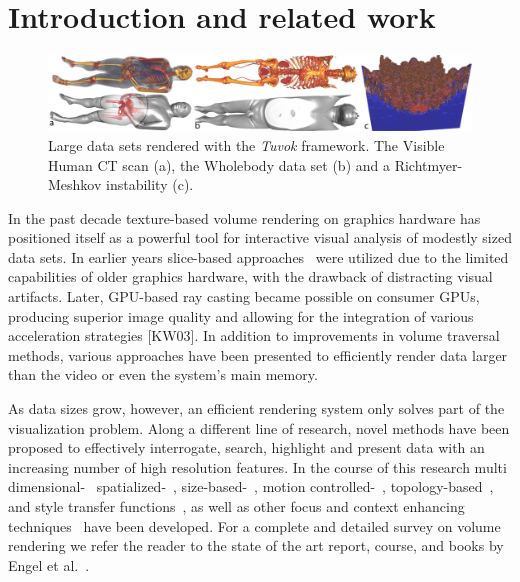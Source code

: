 \section{Introduction and related work}

\begin{figure}
	\includegraphics[width=\linewidth]{images/arch/vh-rm}

  \caption{Large data sets rendered with the \textit{Tuvok} framework.
  The Visible Human CT scan (a), the Wholebody data set (b) and a
  Richtmyer-Meshkov instability (c).}
	\label{fig:tvktease}
\end{figure}

In the past decade texture-based volume rendering on graphics hardware
has positioned itself as a powerful tool for interactive visual
analysis of modestly sized data sets. In earlier years slice-based
approaches~\cite{Cullip:1993:AVRW, Cabral:1994:AVRA} were utilized
due to the limited capabilities of older graphics hardware, with the
drawback of distracting visual artifacts. Later, GPU-based ray casting
became possible on consumer GPUs, producing superior image quality
and allowing for the integration of various acceleration strategies
[KW03]. In addition to improvements in volume traversal methods,
various approaches have been presented to efficiently render data
larger than the video or even the system's main memory.

As data sizes grow, however, an efficient rendering system only solves
part of the visualization problem. Along a different line of research,
novel methods have been proposed to effectively interrogate, search,
highlight and present data with an increasing number of high resolution
features. In the course of this research multi
dimensional-~\cite{Kniss:2005:Multidim}
spatialized-~\cite{Roettger:2005:Spatialized},
size-based-~\cite{Correa:2008:Size-based}, motion
controlled-~\cite{Correa:2005:Motion},
topology-based~\cite{Weber:2007:Topology},
and style transfer functions~\cite{Bruckner:2007:Style}, as well as
other focus and context enhancing
techniques~\cite{Viola:2005:Illustrative, Wang:2005:Lens,
Krueger:2006:ClearView} have been developed. For a complete and
detailed survey on volume rendering we refer the reader to the state of
the art report, course, and books by Engel et
al.~\cite{Engel:2002:IHQV, Engel:2004:RTVG, Engel:2006:RTVG}.

